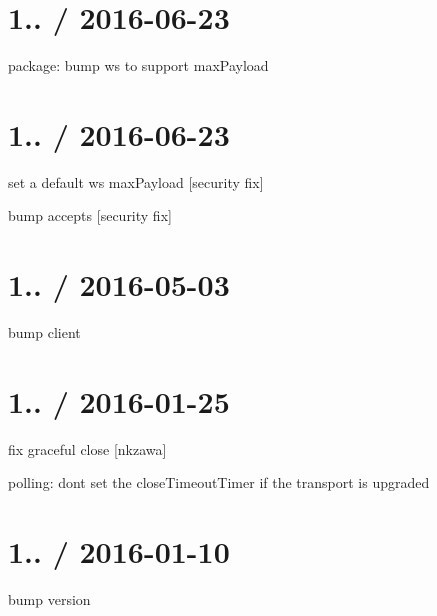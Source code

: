 \section*{1.. / 2016-\/06-\/23 }


\begin{DoxyItemize}
\item package\+: bump {\ttfamily ws} to support {\ttfamily max\+Payload}
\end{DoxyItemize}

\section*{1.. / 2016-\/06-\/23 }


\begin{DoxyItemize}
\item set a default ws {\ttfamily max\+Payload} \mbox{[}security fix\mbox{]}
\item bump {\ttfamily accepts} \mbox{[}security fix\mbox{]}
\end{DoxyItemize}

\section*{1.. / 2016-\/05-\/03 }


\begin{DoxyItemize}
\item bump client
\end{DoxyItemize}

\section*{1.. / 2016-\/01-\/25 }


\begin{DoxyItemize}
\item fix graceful close \mbox{[}nkzawa\mbox{]}
\item polling\+: don\textquotesingle{}t set the {\ttfamily close\+Timeout\+Timer} if the transport is upgraded
\end{DoxyItemize}

\section*{1.. / 2016-\/01-\/10 }


\begin{DoxyItemize}
\item bump version
\end{DoxyItemize}

